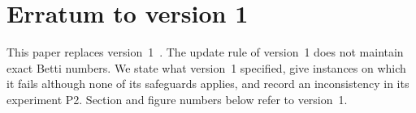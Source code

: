
%
  {}{}
\providecommand{\RefEOneCountsShort}{\textbf{??}}
\providecommand{\RefEOneCountSeven}{\textbf{??}}
\providecommand{\RefEOneFailSeven}{\textbf{??}}
\providecommand{\RefEOneVOnePad}{\textbf{??}}
\providecommand{\RefEOneVOneRhoMax}{\textbf{??}}
\providecommand{\RefEOneVOneRowOrders}{\textbf{??}}
\providecommand{\RefETwoCycleRho}{\textbf{??}}
\providecommand{\RefETwoTorusRho}{\textbf{??}}

\section{Erratum to version 1}\label{sec:erratum}

This paper replaces version~1~\cite{ouyang2025mmhm_v1}. The update rule of
version~1 does not maintain exact Betti numbers. We state what version~1
specified, give instances on which it fails although none of its safeguards
applies, and record an inconsistency in its experiment P2. Section and figure
numbers below refer to version~1.


